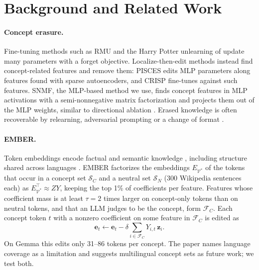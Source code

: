 \documentclass[11pt]{article}
\begin{document}
\section{Background and Related Work}

\paragraph{Concept erasure.}
Fine-tuning methods such as RMU \citep{li2024wmdp} and the Harry Potter unlearning of \citet{eldan2023harry} update many parameters with a forget objective.
Localize-then-edit methods instead find concept-related features and remove them: PISCES \citep{gurarieh2025precise} edits MLP parameters along features found with sparse autoencoders, and CRISP \citep{ashuach2026crisp} fine-tunes against such features.
SNMF, the MLP-based method we use, finds concept features in MLP activations with a semi-nonnegative matrix factorization \citep{ding2010convex,shafran2026constructing} and projects them out of the MLP weights, similar to directional ablation \citep{arditi2024refusal}.
Erased knowledge is often recoverable by relearning, adversarial prompting or a change of format \citep{deeb2024unlearning,lynch2024eight,hong2025intrinsic,ye2025formindependent}.

\paragraph{EMBER.}
Token embeddings encode factual and semantic knowledge \citep{geva2023dissecting}, including structure shared across languages \citep{wenyi2023hyperpolyglot}.
EMBER \citep{suslik2026ember} factorizes the embeddings $E_{\mathcal{V}^*}$ of the tokens that occur in a concept set $\mathcal{S}_C$ and a neutral set $\mathcal{S}_N$ (300 Wikipedia sentences each) as $E_{\mathcal{V}^*}^\top \approx ZY$, keeping the top 1\% of coefficients per feature.
Features whose coefficient mass is at least $\tau = 2$ times larger on concept-only tokens than on neutral tokens, and that an LLM judges to be the concept, form $\mathcal{F}_C$.
Each concept token $t$ with a nonzero coefficient on some feature in $\mathcal{F}_C$ is edited as
\begin{equation}
  \mathbf{e}_t \leftarrow \mathbf{e}_t - \delta \textstyle\sum_{i \in \mathcal{F}_C} Y_{i,t}\,\mathbf{z}_i .
  \label{eq:ember}
\end{equation}
On Gemma this edits only 31--86 tokens per concept.
The paper names language coverage as a limitation and suggests multilingual concept sets as future work; we test both.
\end{document}
